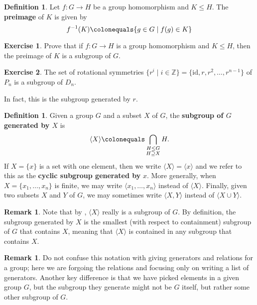 \documentclass[12pt]{report}
\numberwithin{equation}{section}
\numberwithin{theorem}{chapter}
\theoremstyle{definition}
\newtheorem{definition}[theorem]{Definition}
\newtheorem{exercise}{Exercise}
\newtheorem*{basic properties}{Basic Properties}
\newtheorem*{Important Remark}{Important Remark}
\newtheorem{remark}[theorem]{Remark}
\begin{document}
\begin{definition}
Let $f\!:G\to H$ be a group homomorphism and $K\leq H$. The {\bf preimage} of $K$ is given by
$$f^{-1}(K) \colonequals \{g\in G \mid f(g)\in K\}$$
\end{definition}


\begin{exercise}\label{preimage is a subgroup}
Prove that if $f\!:G\to H$ is a group homomorphism and $K\leq H$, then the preimage of $K$ is a subgroup of $G$.
\end{exercise}




\begin{exercise}\label{rotations subgroup of D_n}
	The set of rotational symmetries $\{ r^i \mid i \in \mathbb{Z} \} = \{\mathrm{id}, r, r^2, \dots, r^{n-1}\}$ of $P_n$ is a subgroup of $D_{n}$.
\end{exercise}


In fact, this is the subgroup generated by $r$.


\begin{definition}
Given a group $G$ and a subset $X$ of $G$, the {\bf subgroup of $G$ generated by $X$} is
$$\langle X \rangle \colonequals \bigcap_{\substack{H \leq G \\ H \supseteq X}} H.$$
If $X=\{x\}$ is a set with one element, then we write $\langle X \rangle=\langle x \rangle$ and we refer to this as the {\bf cyclic subgroup generated by} $x$. More generally, when $X = \{ x_1, \ldots, x_n \}$ is finite, we may write $\langle x_1, \ldots, x_n \rangle$ instead of $\langle X \rangle$. Finally, given two subsets $X$ and $Y$ of $G$, we may sometimes write $\langle X, Y \rangle$ instead of $\langle X \cup Y \rangle$.
\end{definition}


\begin{remark}
Note that by , $\langle X \rangle$ really is a subgroup of $G$. By definition, the subgroup generated by $X$ is the smallest (with respect to containment) subgroup of $G$ that contains $X$, meaning that $\langle X \rangle$ is contained in any subgroup that contains $X$.
\end{remark}


\begin{remark}
	Do not confuse this notation with giving generators and relations for a group; here we are forgoing the relations and focusing only on writing a list of generators. Another key difference is that we have picked elements in a given group $G$, but the subgroup they generate might not be $G$ itself, but rather some other subgroup of $G$.
\end{remark}
\end{document}
